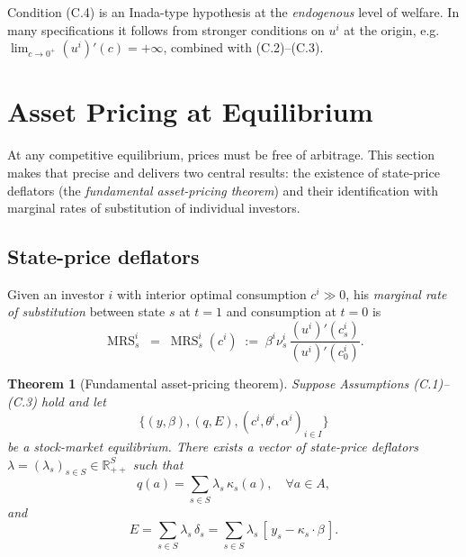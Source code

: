 \documentclass[11pt,a4paper]{article}
\def\R{\mathbb{R}}
\DeclareMathOperator{\MRS}{MRS}
\theoremstyle{plain}
\newtheorem{theorem}{Theorem}[section]
\theoremstyle{definition}
\theoremstyle{remark}
\begin{document}
Condition (C.4) is an Inada-type hypothesis at the \emph{endogenous} level of welfare. In many specifications it follows from stronger conditions on $u^i$ at the origin, e.g.\ $\lim_{c\to 0^+} (u^i)'(c) = +\infty$, combined with (C.2)--(C.3).

\section{Asset Pricing at Equilibrium}

At any competitive equilibrium, prices must be free of arbitrage. This section makes that precise and delivers two central results: the existence of state-price deflators (the \emph{fundamental asset-pricing theorem}) and their identification with marginal rates of substitution of individual investors.

\subsection{State-price deflators}

Given an investor $i$ with interior optimal consumption $c^i\gg 0$, his \emph{marginal rate of substitution} between state $s$ at $t=1$ and consumption at $t=0$ is
\begin{equation}\label{eq:mrs-def}
  \MRS^i_s \;=\; \MRS^i_s(c^i)
  \;:=\; \beta^i\nu^i_s \,\frac{(u^i)'(c^i_s)}{(u^i)'(c^i_0)}.
\end{equation}

\begin{theorem}[Fundamental asset-pricing theorem]\label{thm:fundamental}
Suppose Assumptions \textup{(C.1)--(C.3)} hold and let
\[
  \bigl\{(y,\beta),(q,E),(c^i,\theta^i,\alpha^i)_{i\in I}\bigr\}
\]
be a stock-market equilibrium. There exists a vector of state-price deflators $\lambda=(\lambda_s)_{s\in S}\in\R^S_{++}$ such that
\begin{equation}\label{eq:asset-pricing}
  q(a) = \sum_{s\in S} \lambda_s\,\kappa_s(a),
  \quad \forall a\in A,
\end{equation}
and
\begin{equation}\label{eq:equity-pricing}
  E = \sum_{s\in S} \lambda_s\,\delta_s
    = \sum_{s\in S} \lambda_s\,[\,y_s - \kappa_s\cdot\beta\,].
\end{equation}
\end{theorem}
\end{document}
